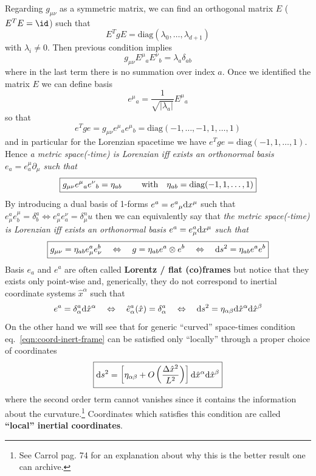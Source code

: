 \documentclass[../main/main.tex]{subfiles}
\begin{document}
Regarding $g_{\mu\nu}$ as a symmetric matrix, we can find an orthogonal matrix $E$ ($E^TE=\id$) such that
\[E^TgE=\text{diag}(\lambda_0,\dots,\lambda_{d+1})\]
with $\lambda_i\neq0$. Then previous condition implies
\[g_{\mu\nu}{E^\mu}_a{E^\nu}_b=\lambda_a\delta_{ab}\]
where in the last term there is no summation over index $a$. Once we identified the matrix $E$ we can define basis
\[{e^\mu}_a=\frac1{\sqrt{|\lambda_a|}}{E^\mu}_a\]
so that 
\[e^Tge=g_{\mu\nu}{e^\mu}_a{e^\mu}_b=\text{diag}(-1,\dots,-1,1,\dots,1)\]
and in particular for the Lorenzian spacetime we have $e^Tge=\text{diag}(-1,1,\dots,1)$.
Hence \textit{a metric space(-time) is Lorenzian iff exists an orthonormal basis $e_a=e_a^\mu\partial_\mu$ such that }
\[\boxed{g_{\mu\nu}{e^\mu}_a{e^\nu}_b=\eta_{ab}$ \qquad\text{with}\quad $\eta_{ab}=\text{diag}(-1,1,\dots,1)}\]
By introducing a dual basis of 1-forms $e^a={e^a}_\mu\textup{d} x^\mu$ such that $e^a_\mu e^\mu_b=\delta^a_b\Leftrightarrow e^a_\mu e^\nu_a=\delta_\mu^nu$ then we can equivalently say that \textit{the metric space(-time) is Lorenzian iff exists an orthonormal basis $e^a=e^a_\mu\textup{d} x^\mu$ such that}
\[\boxed{
g_{\mu\nu}=\eta_{ab}e^a_\mu e^b_\nu\quad\Leftrightarrow\quad g=\eta_{ab}e^a\otimes e^b\quad\Leftrightarrow\quad \textup{d} s^2=\eta_{ab}e^a e^b}\]
Basis $e_a$ and $e^a$ are often called \textbf{Lorentz / flat (co)frames} but notice that they exists only point-wise and, generically, they do not correspond to inertial coordinate systems $\hat x^\alpha$ such that 
\begin{equation}\label{eqn:coord-inert-frame}
e^a=\delta^a_\alpha\textup{d}\hat x^\alpha\quad\Leftrightarrow\quad \hat e^a_\alpha(\hat x)=\delta_\alpha^a\quad\Leftrightarrow\quad \textup{d} s^2=\eta_{\alpha\beta}\textup{d}\hat x^\alpha\textup{d}\hat x^\beta
\end{equation}
On the other hand we will see that for generic ``curved'' space-times condition eq.~\eqref{eqn:coord-inert-frame} can be satisfied only ``locally'' through a proper choice of coordinates
\[\boxed{
\textup{d} s^2=\left[\eta_{\alpha\beta}+O\left(\frac{\Delta\hat x^2}{L^2}\right)\right]\textup{d}\hat x^\alpha\textup{d}\hat x^\beta
}\]
where the second order term cannot vanishes since it contains the information about the curvature.\footnote{See \textsf{Carrol} pag. 74 for an explanation about why this is the better result one can archive.} Coordinates which satisfies this condition are called \textbf{``local'' inertial coordinates}.
\end{document}
